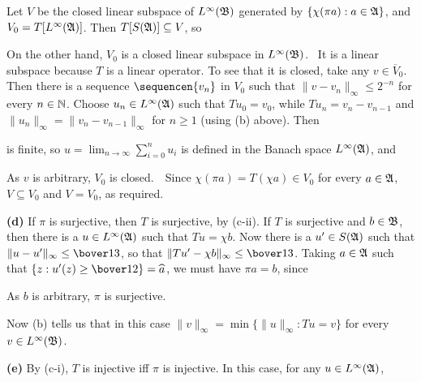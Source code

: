 {\medskip

 Let $V$ be the closed linear subspace of
$L^{\infty}(\frak B)$ generated by $\{\chi(\pi a):a\in\frak A\}$, and
$V_0=T[L^{\infty}(\frak A)]$.   Then $T[S(\frak A)]\subseteq V$, so


\noindent On the other hand, $V_0$ is a closed linear subspace in
$L^{\infty}(\frak B)$.   \Prf\ It is a linear
subspace because $T$ is a linear operator.   To see that it is closed,
take any $v\in\overline{V}_0$.   Then there is a sequence
$\sequencen{v_n}$ in $V_0$ such that
$\|v-v_n\|_{\infty}\le 2^{-n}$ for every $n\in\Bbb N$.
Choose $u_n\in L^{\infty}(\frak A)$ such that $Tu_0=v_0$, while
$Tu_n=v_n-v_{n-1}$ and $\|u_n\|_{\infty}=\|v_n-v_{n-1}\|_{\infty}$ for
$n\ge 1$ (using (b) above).   Then


\noindent is finite, so $u=\lim_{n\to\infty}\sum_{i=0}^nu_i$ is defined
in the Banach space $L^{\infty}(\frak A)$, and


\noindent As $v$ is arbitrary, $V_0$ is closed.\ \QeD\   Since
$\chi(\pi a)=T(\chi a)\in V_0$ for every $a\in\frak A$, $V\subseteq V_0$
and $V=V_0$, as required.

\medskip

{\bf (d)}  If $\pi$ is surjective, then $T$ is surjective, by (c-ii).
If $T$ is surjective and $b\in\frak B$, then there is a
$u\in L^{\infty}(\frak A)$ such that $Tu=\chi b$.   Now there is a
$u'\in S(\frak A)$ such that $\|u-u'\|_{\infty}\le\bover13$, so that
$\|Tu'-\chi b\|_{\infty}\le\bover13$.   Taking $a\in\frak A$ such that
$\{z:u'(z)\ge\bover12\}=\widehat a$, we must have $\pi a=b$, since


\noindent As $b$ is arbitrary, $\pi$ is surjective.

Now (b) tells us that in this case
$\|v\|_{\infty}=\min\{\|u\|_{\infty}:Tu=v\}$ for every
$v\in L^{\infty}(\frak B)$.

\medskip

{\bf (e)} By (c-i), $T$ is injective iff $\pi$ is injective.   In
this case, for any $u\in L^{\infty}(\frak A)$,

}

